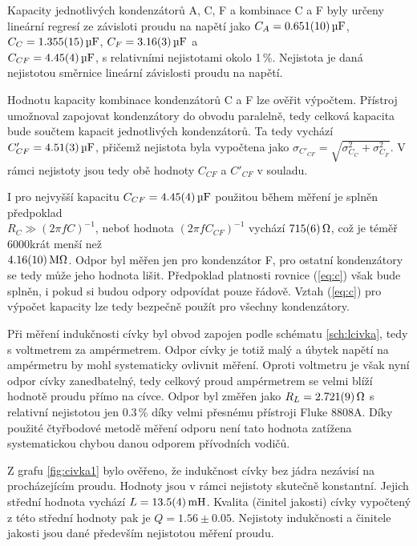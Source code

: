 \documentclass{../concepts/prepareprotokol} %
\begin{document}
Kapacity jednotlivých kondenzátorů A, C, F a kombinace C a F byly určeny lineární regresí ze závisloti proudu na napětí jako $C_A = \qty{0.651 \pm 0.010}{\micro\farad}$, $C_C = \qty{1.355 \pm 0.015}{\micro\farad}$, $C_F = \qty{3.16 \pm 0.03}{\micro\farad}$ a \\$C_{CF} = \qty{4.45 \pm 0.04}{\micro\farad}$, s relativními nejistotami okolo 1\,\%. Nejistota je daná nejistotou směrnice lineární závislosti proudu na napětí. 

Hodnotu kapacity kombinace kondenzátorů C a F lze ověřit výpočtem. Přístroj umožnoval zapojovat kondenzátory do obvodu paralelně, tedy celková kapacita bude součtem kapacit jednotlivých kondenzátorů. Ta tedy vychází $C'_{CF} = \qty{4.51\pm0.03}{\micro\farad}$, přičemž nejistota byla vypočtena jako $\sigma_{C'_{CF}} = \sqrt{\sigma_{C_C}^2 + \sigma_{C_F}^2}$. V rámci nejistoty jsou tedy obě hodnoty $C_{CF}$ a $C'_{CF}$ v souladu.

I pro nejvyšší kapacitu $C_{CF} = \qty{4.45 \pm 0.04}{\micro\farad}$ použitou během měření je splněn předpoklad \\$R_C \gg (2 \pi f C)^{-1}$, neboť hodnota $(2 \pi f C_{CF})^{-1}$ vychází $\qty{715\pm6}{\ohm}$, což je téměř 6000krát menší než \\$\qty{4.16\pm0.10}{\mega\ohm}$. Odpor byl měřen jen pro kondenzátor F, pro ostatní kondenzátory se tedy může jeho hodnota lišit. Předpoklad platnosti rovnice (\ref{eq:c}) však bude splněn, i pokud si budou odpory odpovídat pouze řádově. Vztah (\ref{eq:c}) pro výpočet kapacity lze tedy bezpečně použít pro všechny kondenzátory.

Při měření indukčnosti cívky byl obvod zapojen podle schématu \ref{sch:lcivka}, tedy s voltmetrem za ampérmetrem. Odpor cívky je totiž malý a úbytek napětí na ampérmetru by mohl systematicky ovlivnit měření. Oproti voltmetru je však nyní odpor cívky zanedbatelný, tedy celkový proud ampérmetrem se velmi blíží hodnotě proudu přímo na cívce. Odpor byl změřen jako $R_L = \qty{2.721\pm0.009}{\ohm}$ s relativní nejistotou jen 0.3\,\% díky velmi přesnému přístroji Fluke 8808A. Díky použité čtyřbodové metodě měření odporu není tato hodnota zatížena systematickou chybou danou odporem přívodních vodičů.

Z grafu \ref{fig:civka1} bylo ověřeno, že indukčnost cívky bez jádra nezávisí na procházejícím proudu. Hodnoty jsou v rámci nejistoty skutečně konstantní. Jejich střední hodnota vychází $L = \qty{13.5\pm0.4}{\milli\henry}$. Kvalita (činitel jakosti) cívky vypočtený z této střední hodnoty pak je $Q = 1.56\pm0.05$. Nejistoty indukčnosti a činitele jakosti jsou dané především nejistotou měření proudu.
\end{document}
